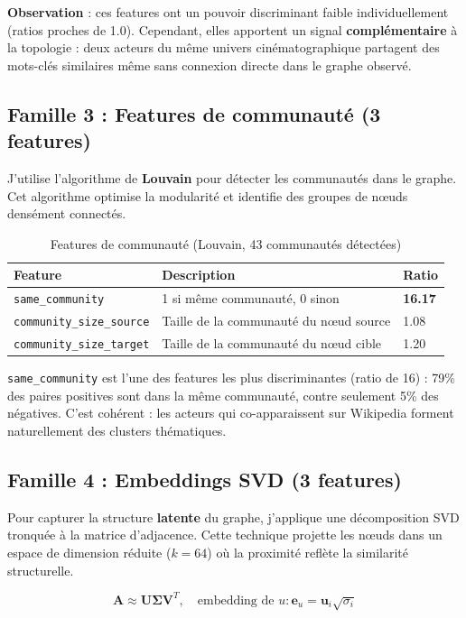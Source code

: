\documentclass[12pt,a4paper]{article}
\begin{document}
\textbf{Observation} : ces features ont un pouvoir discriminant faible individuellement (ratios proches de 1.0). Cependant, elles apportent un signal \textbf{complémentaire} à la topologie : deux acteurs du même univers cinématographique partagent des mots-clés similaires même sans connexion directe dans le graphe observé.

\subsection{Famille 3 : Features de communauté (3 features)}

J'utilise l'algorithme de \textbf{Louvain} pour détecter les communautés dans le graphe. Cet algorithme optimise la modularité et identifie des groupes de nœuds densément connectés.

\begin{table}[H]
\centering
\begin{tabular}{p{5cm}p{6cm}p{2cm}}
\toprule
\textbf{Feature} & \textbf{Description} & \textbf{Ratio} \\
\midrule
\texttt{same\_community} & 1 si même communauté, 0 sinon & \textbf{16.17} \\
\texttt{community\_size\_source} & Taille de la communauté du nœud source & 1.08 \\
\texttt{community\_size\_target} & Taille de la communauté du nœud cible & 1.20 \\
\bottomrule
\end{tabular}
\caption{Features de communauté (Louvain, 43 communautés détectées)}
\end{table}

\texttt{same\_community} est l'une des features les plus discriminantes (ratio de 16) : 79\% des paires positives sont dans la même communauté, contre seulement 5\% des négatives. C'est cohérent : les acteurs qui co-apparaissent sur Wikipedia forment naturellement des clusters thématiques.

\subsection{Famille 4 : Embeddings SVD (3 features)}

Pour capturer la structure \textbf{latente} du graphe, j'applique une décomposition SVD tronquée à la matrice d'adjacence. Cette technique projette les nœuds dans un espace de dimension réduite ($k = 64$) où la proximité reflète la similarité structurelle.

\begin{equation}
\mathbf{A} \approx \mathbf{U} \boldsymbol{\Sigma} \mathbf{V}^T, \quad \text{embedding de } u : \mathbf{e}_u = \mathbf{u}_i \sqrt{\sigma_i}
\end{equation}
\end{document}
